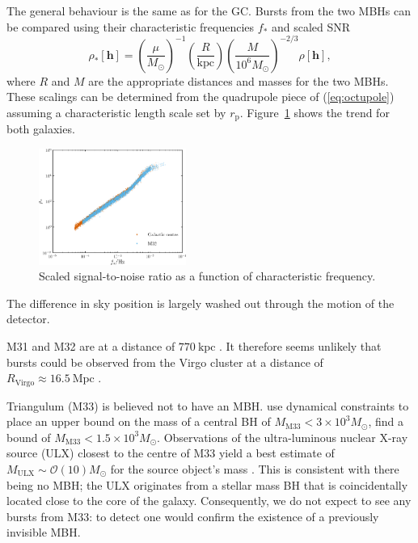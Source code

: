 \documentclass[useAMS,usedcolumn,usegraphicx,usenatbib]{mn2e}
\newcommand{\eqnref}[1]{(\ref{eq:#1})}
\newcommand{\Figref}[1]{Figure~\ref{fig:#1}}
\newcommand{\units}[1]{\ensuremath{~\mathrm{#1}}}
\newcommand{\sub}[1]{\ensuremath{_\mathrm{#1}}}
\newcommand{\order}[1]{\ensuremath{\mathcal{O}({#1})}}
\begin{document}
The general behaviour is the same as for the GC. Bursts from the two MBHs can be compared using their characteristic frequencies $f_\ast$ and scaled SNR
\begin{equation}
\rho_\ast[\boldsymbol{h}] = \left(\frac{\mu}{M_\odot}\right)^{-1}\left(\frac{R}{\mathrm{kpc}}\right)\left(\frac{M}{10^6 M_\odot}\right)^{-2/3}\rho[\boldsymbol{h}],
\end{equation}
where $R$ and $M$ are the appropriate distances and masses for the two MBHs. These scalings can be determined from the quadrupole piece of \eqnref{octupole} assuming a characteristic length scale set by $r\sub{p}$. \Figref{SNR-scaling} shows the trend for both galaxies.
\begin{figure}
  \begin{center}
  \includegraphics[width=0.43\textwidth]{Fig_SNR_scaled}
    \caption{Scaled signal-to-noise ratio as a function of characteristic frequency.\label{fig:SNR-scaling}}
  \end{center}
\end{figure}
The difference in sky position is largely washed out through the motion of the detector.

M31 and M32 are at a distance of $770\units{kpc}$ \citep{Karachentsev2004}. It therefore seems unlikely that bursts could be observed from the Virgo cluster at a distance of $R\sub{Virgo} \approx 16.5\units{Mpc}$ \citep{Mei2007}.

Triangulum (M33) is believed not to have an MBH. \citet{Merritt2001} use dynamical constraints to place an upper bound on the mass of a central BH of $M\sub{M33} < 3 \times 10^3 M_\odot$, \citet{Gebhardt2001} find a bound of $M\sub{M33} < 1.5 \times 10^3 M_\odot$. Observations of the ultra-luminous nuclear X-ray source (ULX) closest to the centre of M33 yield a best estimate of $M\sub{ULX} \sim \order{10} M_\odot$ for the source object's mass \citep{Foschini2004, Weng2009}. This is consistent with there being no MBH; the ULX originates from a stellar mass BH that is coincidentally located close to the core of the galaxy. Consequently, we do not expect to see any bursts from M33: to detect one would confirm the existence of a previously invisible MBH.
\end{document}
